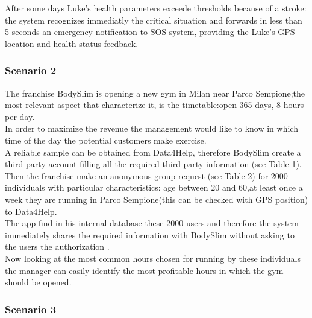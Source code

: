       After some days Luke's health parameters exceede thresholds because of a stroke: the system recognizes immediatly the critical situation and forwards in less than 5 seconds an emergency notification to SOS system, providing the Luke's GPS location and health status feedback.


    \subsubsection{Scenario 2}

    The franchise BodySlim is opening a new gym in Milan near Parco Sempione;the most relevant aspect that characterize it, is the timetable:open 365 days, 8 hours per day. \\In order to maximize the revenue the management would like to know in which time of the day the potential customers make exercise.\\A reliable sample can be obtained from Data4Help, therefore BodySlim create a third party account filling all the required third party information (see Table 1). \\Then the franchise make an anonymous-group request (see Table 2) for 2000 individuals with particular characteristics: age between 20 and 60,at least once a week they are running in Parco Sempione(this can be checked with GPS position) to Data4Help. \\The app find in his internal database these 2000 users and therefore the system immediately shares the required information with BodySlim without asking to the users the authorization .\\Now looking at the most common hours chosen for running by these individuals the manager can easily identify the most profitable hours in which the gym should be opened.

    \subsubsection{Scenario 3}

